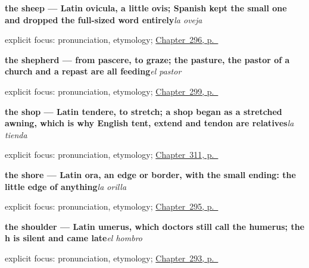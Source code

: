 \noindent\begin{minipage}[t]{\linewidth}
\raggedright
\textbf{the sheep — Latin ovicula, a little ovis; Spanish kept the small one and dropped the full-sized word entirely}\enspace\emph{la oveja}\par
\footnotesize explicit focus: pronunciation, etymology; \hyperref[ch:animales]{Chapter~296, p.~\pageref*{ch:animales}}
\end{minipage}\par\smallskip

\noindent\begin{minipage}[t]{\linewidth}
\raggedright
\textbf{the shepherd — from pascere, to graze; the pasture, the pastor of a church and a repast are all feeding}\enspace\emph{el pastor}\par
\footnotesize explicit focus: pronunciation, etymology; \hyperref[ch:la-granja]{Chapter~299, p.~\pageref*{ch:la-granja}}
\end{minipage}\par\smallskip

\noindent\begin{minipage}[t]{\linewidth}
\raggedright
\textbf{the shop — Latin tendere, to stretch; a shop began as a stretched awning, which is why English tent, extend and tendon are relatives}\enspace\emph{la tienda}\par
\footnotesize explicit focus: pronunciation, etymology; \hyperref[ch:la-tienda-y-la-cuenta]{Chapter~311, p.~\pageref*{ch:la-tienda-y-la-cuenta}}
\end{minipage}\par\smallskip

\noindent\begin{minipage}[t]{\linewidth}
\raggedright
\textbf{the shore — Latin ora, an edge or border, with the small ending: the little edge of anything}\enspace\emph{la orilla}\par
\footnotesize explicit focus: pronunciation, etymology; \hyperref[ch:el-sendero]{Chapter~295, p.~\pageref*{ch:el-sendero}}
\end{minipage}\par\smallskip

\noindent\begin{minipage}[t]{\linewidth}
\raggedright
\textbf{the shoulder — Latin umerus, which doctors still call the humerus; the h is silent and came late}\enspace\emph{el hombro}\par
\footnotesize explicit focus: pronunciation, etymology; \hyperref[ch:mas-del-cuerpo]{Chapter~293, p.~\pageref*{ch:mas-del-cuerpo}}
\end{minipage}\par\smallskip

